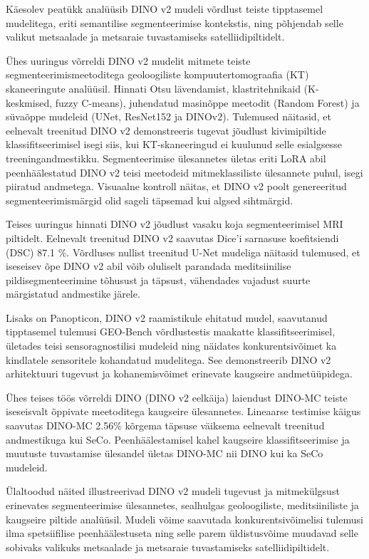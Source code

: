 Käesolev peatükk analüüsib DINO v2 mudeli võrdlust teiste tipptasemel mudelitega, eriti semantilise segmenteerimise kontekstis, ning põhjendab selle valikut metsaalade ja metsaraie tuvastamiseks satelliidipiltidelt.

Ühes uuringus võrreldi DINO v2 mudelit mitmete teiste segmenteerimismeetoditega
 geoloogiliste kompuutertomograafia (KT) skaneeringute analüüsil. Hinnati Otsu
 lävendamist, klastritehnikaid (K-keskmised, fuzzy C-means), juhendatud
 masinõppe meetodit (Random Forest) ja süvaõppe mudeleid (UNet, ResNet152 ja
 DINOv2). Tulemused näitasid, et eelnevalt treenitud DINO v2 demonstreeris
 tugevat jõudlust kivimipiltide klassifitseerimisel isegi siis, kui
 KT-skaneeringud ei kuulunud selle esialgsesse treeningandmestikku.
 Segmenteerimise ülesannetes ületas eriti LoRA abil peenhäälestatud DINO v2
 teisi meetodeid mitmeklassiliste ülesannete puhul, isegi piiratud andmetega.
 Visuaalne kontroll näitas, et DINO v2 poolt genereeritud segmenteerimismärgid
 olid sageli täpsemad kui algsed sihtmärgid. \cite{DINOv2RocksGeological}

Teises uuringus hinnati DINO v2 jõudlust vasaku koja segmenteerimisel MRI
 piltidelt. Eelnevalt treenitud DINO v2 saavutas Dice'i sarnasuse koefitsiendi
 (DSC)  87.1 \%. Võrdluses nullist treenitud U-Net
 mudeliga näitasid tulemused, et iseseisev õpe DINO v2 abil võib oluliselt
 parandada meditsiinilise pildisegmenteerimine tõhusust ja täpsust, vähendades
 vajadust suurte märgistatud andmestike järele. \cite{kunduAssessingPerformanceDINOv22024}

Lisaks on Panopticon, DINO v2 raamistikule ehitatud mudel, saavutanud
 tipptasemel tulemusi GEO-Bench võrdlustestis maakatte klassifitseerimisel,
 ületades teisi sensoragnostilisi mudeleid ning näidates konkurentsivõimet ka
 kindlatele sensoritele kohandatud mudelitega. See demonstreerib DINO v2
 arhitektuuri tugevust ja kohanemisvõimet erinevate kaugseire andmetüüpidega. \cite{PanopticonAdvancingAnySensor}

Ühes teises töös võrreldi DINO (DINO v2 eelkäija) laiendust DINO-MC teiste
iseseisvalt õppivate meetoditega kaugseire ülesannetes. Lineaarse testimise
käigus saavutas DINO-MC 2.56\% kõrgema täpsuse väiksema eelnevalt treenitud
andmestikuga kui SeCo. Peenhäälestamisel kahel kaugseire klassifitseerimise ja
muutuste tuvastamise ülesandel ületas DINO-MC nii DINO kui ka SeCo mudeleid. \cite{ExtendingGloballocalView}

Ülaltoodud näited illustreerivad DINO v2 mudeli tugevust ja mitmekülgsust
erinevates segmenteerimise ülesannetes, sealhulgas geoloogiliste, meditsiiniliste
ja kaugseire piltide analüüsil. Mudeli võime saavutada konkurentsivõimelisi
tulemusi ilma spetsiifilise peenhäälestuseta ning selle parem üldistusvõime
muudavad selle sobivaks valikuks metsaalade ja metsaraie tuvastamiseks
satelliidipiltidelt.